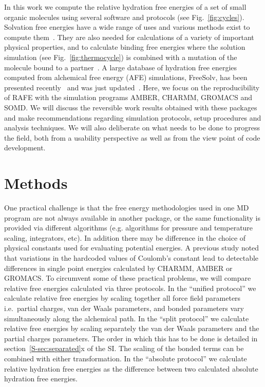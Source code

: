 \documentclass[journal=jctcce,manuscript=article]{achemso}
\begin{document}
In this work we compute the relative hydration free energies of a
set of small organic molecules using several software and protocols (see Fig.~\ref{fig:cycles}).  Solvation free
energies have a wide range of uses and various methods exist to compute
them~\cite{Skyner:2015:PCCP}.  They are also needed for calculations of a
variety of important physical properties, and to calculate binding free
energies where the solution simulation  (see Fig.~\ref{fig:thermocycle}) is
combined with a mutation of the molecule bound to a
partner~\cite{Skyner:2015:PCCP}.  A large database of hydration free energies
computed from alchemical free energy (AFE) simulations, FreeSolv, has been
presented recently~\cite{Mobley2014} and was just
updated~\cite{doi:10.1021/acs.jced.7b00104}.  Here, we focus on the
reproducibility of RAFE with the simulation programs AMBER, CHARMM, GROMACS and
SOMD.  We will discuss the reversible work results obtained with these packages
and make recommendations regarding simulation protocols, setup procedures and
analysis techniques.  We will also deliberate on what needs to be done to
progress the field, both from a usability perspective as well as from the view
point of code development.


\section{Methods}
\label{sec:methods}

One practical challenge is that the free energy methodologies
used in one MD program are not always available in another
package, or the same functionality is provided via different algorithms (e.g. algorithms for pressure and temperature 
scaling, integrators, etc).  In addition there may be difference in the  choice of physical constants used for evaluating potential energies. A previous study noted that variations in the hardcoded values of Coulomb's constant lead to detectable differences in single point energies calculated by CHARMM, AMBER or GROMACS.\cite{Shirts2017,SOMDcoulomb}  
To circumvent some of these practical problems, 
we will compare relative free energies calculated via three
protocols.  In the ``unified protocol'' we calculate relative free
energies by scaling together all force field parameters i.e.\ partial
charges, van der Waals parameters, and bonded parameters vary
simultaneously along the alchemical path.  In the ``split protocol''
we calculate relative free energies by scaling separately the van der
Waals parameters and the partial charges parameters.  The order in
which this has to be done is detailed in
section~\ref{S-sec:separated}x of the SI.  The scaling of the bonded terms can be combined with either transformation.  In the ``absolute protocol'' we calculate relative hydration free energies as the difference between two calculated absolute hydration free energies.
\end{document}
